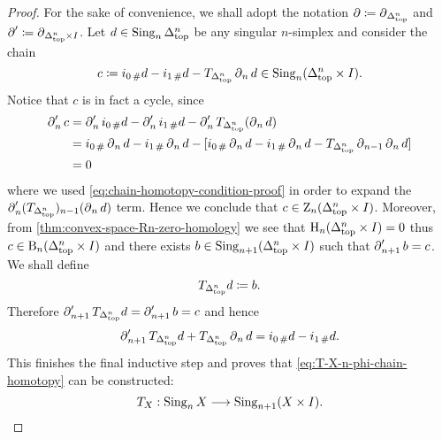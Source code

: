 \begin{proof}
    For the sake of convenience, we shall adopt the notation
    \(\operatorname{\partial} \coloneq \operatorname{\partial}_{\Delta_{\text{top}}^n}\) and
    \(\operatorname{\partial}' \coloneq \operatorname{\partial}_{\Delta_{\text{top}}^n \times I}\). Let
    \(d \in \operatorname{Sing}_n \Delta_{\text{top}}^n\) be any singular \(n\)-simplex and consider the
    chain
    \[
        c \coloneq i_{0\, \#} d - i_{1\, \#} d -
        T_{\Delta_{\text{top}}^n} \operatorname{\partial}_n d \in \operatorname{Sing}_n(\Delta_{\text{top}}^n \times I).
    \]
    Notice that \(c\) is in fact a cycle, since
    \begin{align*}
        \operatorname{\partial}'_n c
         & = \operatorname{\partial}'_n i_{0\, \#} d -
        \operatorname{\partial}'_n i_{1\, \#} d -
        \operatorname{\partial}'_n T_{\Delta_{\text{top}}^n} (\operatorname{\partial}_n d) \\
         & = i_{0\, \#} \operatorname{\partial}_n d -
        i_{1\, \#} \operatorname{\partial}_n d -
        [
        i_{0\, \#} \operatorname{\partial}_n d - i_{1\, \#} \operatorname{\partial}_n d -
        T_{\Delta_{\text{top}}^n} \operatorname{\partial}_{n-1} \operatorname{\partial}_n d
        ]                                   \\
         & = 0
    \end{align*}
    where we used \cref{eq:chain-homotopy-condition-proof} in order to expand the
    \(\operatorname{\partial}'_n (T_{\Delta_{\text{top}}^n})_{n-1}(\operatorname{\partial}_n d)\) term. Hence we conclude that
    \(c \in \operatorname{Z}_n(\Delta_{\text{top}}^n \times I)\). Moreover, from
    \cref{thm:convex-space-Rn-zero-homology} we see that
    \(\operatorname{H}_n(\Delta_{\text{top}}^n \times I) = 0\) thus \(c \in \operatorname{B}_n(\Delta_{\text{top}}^n \times I)\) and
    there exists \(b \in \operatorname{Sing}_{n+1}(\Delta_{\text{top}}^n \times I)\) such that
    \(\operatorname{\partial}_{n+1}' b = c\). We shall define
    \[
        T_{\Delta_{\text{top}}^n} d \coloneq b.
    \]
    Therefore \(\operatorname{\partial}_{n+1}' T_{\Delta_{\text{top}}^n} d = \operatorname{\partial}_{n+1}' b = c\) and hence
    \[
        \operatorname{\partial}'_{n+1} T_{\Delta_{\text{top}}^n} d + T_{\Delta_{\text{top}}^n} \operatorname{\partial}_n d
        = i_{0\, \#} d - i_{1\, \#} d.
    \]
    This finishes the final inductive step and proves that
    \cref{eq:T-X-n-phi-chain-homotopy} can be constructed:
    \[
        T_X: \operatorname{Sing}_n X \longrightarrow \operatorname{Sing}_{n+1}(X \times I).
    \]


\end{proof}
